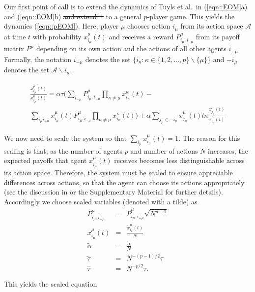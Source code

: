 \documentclass[sigconf,anonymous]{aamas}
\newcommand{\xmu}[2]{x_{#1_#2}^{#2}(t)}
\newcommand{\payoff}[2]{P^{#2}_{#1_#2, #1_{-#2}}}
\newcommand{\txmu}[2]{\tilde{x}_{#1_#2}^{#2}(t)}
\newcommand{\tpayoff}[2]{\tilde{P}^{#2}_{#1_#2, #1_{-#2}}}
\newcommand{\talpha}{\tilde{\alpha}}
\newcommand{\ttau}{\tilde{\tau}}
\newcommand{\htau}{\hat{\tau}}
\begin{document}
Our first point of call is to extend the dynamics of Tuyls et al.~in  (\ref{eqn::EOM}a) and (\ref{eqn::EOM}b) \st{and extend it} to a general $p$-player game. This yields the dynamics (\ref{eqn::pEOM}). Here, player $\mu$ chooses action $i_{\mu}$ from its action space $\mathcal{A}$ at time $t$ with probability $\xmu{i}{\mu}$ and receives a reward $\payoff{i}{\mu}$ from its payoff matrix $P^\mu$ depending on its own action and the actions of all other agents $i_{-\mu}$. Formally, the notation $i_{-\mu}$ denotes the set $\{ i_\kappa : \kappa \in \{1, 2, ..., p\} \backslash \{\mu\} \}$ and $-i_{\mu}$ denotes the set $\mathcal{A} \backslash {i_\mu}$.

\begin{equation}
\begin{split}
    \label{eqn::pEOM}
    \frac{\dot{\xmu{i}{\mu}}}{\xmu{i}{\mu}} = \alpha \tau ( \sum_{i_{-\mu}} \payoff{i}{\mu} \prod_{\kappa \neq \mu} \xmu{i}{\kappa} - \\ \sum_{i_\mu i_{-\mu}} \xmu{i}{\mu} \payoff{i}{\mu} \prod_{\kappa \neq \mu} \xmu{i}{\kappa} ) + \alpha \sum_{j_\mu \in -i_\mu} \xmu{j}{\mu} ln \frac{\xmu{j}{\mu}}{\xmu{i}{\mu}}
\end{split}
\end{equation}

We now need to scale the system so that $\sum_{i_\mu} \xmu{i}{\mu} = 1$. The reason for this scaling is that, as the number of agents $p$ and number of actions $N$ increases, the expected payoffs that agent $\xmu{i}{\mu}$ receives becomes less distinguishable across its action space. Therefore, the system must be scaled to ensure appreciable differences across actions, so that the agent can choose its actions appropriately (see the discussion in \cite{Sanders2018} or the Supplementary Material for further details). Accordingly we choose scaled variables (denoted with a tilde) as
%
\begin{eqnarray*}
        \payoff{i}{\mu} & = & \tpayoff{i}{\mu} \sqrt{N^{p-1}}\\
        \xmu{i}{\mu} & = & \frac{\txmu{i}{\mu}}{N} \\
        \talpha & = & \frac{\alpha}{N} \\
        \ttau & = & N^{-(p-1)/2} \tau \\
        \htau & = & N^{-p/2} \tau.
\end{eqnarray*}

This yields the scaled equation
\end{document}

